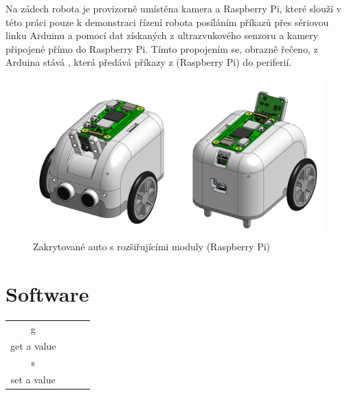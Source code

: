\documentclass[12pt]{article}
\begin{document}
\begin{spacing}{1.5}
	Na zádech robota je provizorně umístěna kamera a Raspberry Pi, které slouží v této práci pouze k demonstraci řízení robota posíláním příkazů přes sériovou linku Arduinu a pomocí dat získaných z ultrazvukového senzoru a kamery připojené přímo do Raspberry Pi. Tímto propojením se, obrazně řečeno, z Arduina stává , která předává příkazy z  (Raspberry Pi) do periferií.
	
	\begin{figure}[H]
		\centering
		\includegraphics[width=\linewidth]{model_vse}
		\caption{Zakrytované auto s rozšiřujícími moduly (Raspberry Pi)}
		\label{fig:model_vse}
	\end{figure}
	
	\newpage
	\section{Software}
	\begin{tabular}{|c|c|c|c|}
		\hline
		g 			\\
		get a value	\\
		\hline
		s 			\\
		set a value \\
		\hline
	\end{tabular}
	
\end{spacing}
\end{document}
